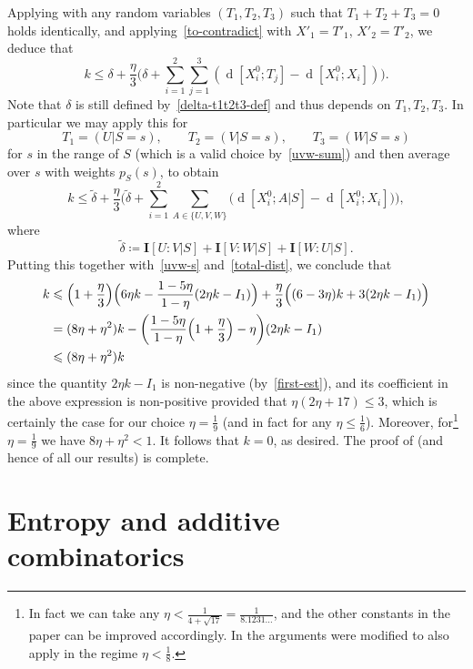 \documentclass[12pt,reqno,tbtags]{amsart}
\theoremstyle{definition}
\theoremstyle{remark}
\renewcommand{\leq}{\leqslant}
\renewcommand{\le}{\leq}
\newcommand{\I}[1]{\mathbf{I}[#1]}
\newcommand{\dist}[2]{{\operatorname{d}[#1;#2]}} %
\numberwithin{equation}{section}
\begin{document}
Applying  with any random variables $(T_1,T_2,T_3)$ such that $T_1+T_2+T_3=0$ holds identically, and applying~\eqref{to-contradict} with $X'_1 = T'_1$, $X'_2 = T'_2$, we deduce that
\[
  k \leq \delta + \frac{\eta}{3} \biggl( \delta + \sum_{i=1}^2 \sum_{j = 1}^3 (\dist{X^0_i}{T_j} -\dist{X^0_i}{X_i}) \biggr).
\]
Note that $\delta$ is still defined by~\eqref{delta-t1t2t3-def} and thus depends on $T_1,T_2,T_3$.
In particular we may apply this for
\[
  T_1 = (U | S = s),\qquad T_2 = (V | S = s), \qquad T_3 = (W | S = s)
\]
for $s$ in the range of $S$ (which is a valid choice by~\eqref{uvw-sum}) and then average over $s$ with weights $p_S(s)$, to obtain
\begin{equation}\label{almost-done}
  k \leq \tilde \delta + \frac{\eta}{3} \biggl( \tilde \delta + \sum_{i=1}^2 \sum_{A\in\{U,V,W\}} \bigl(  \dist{X^0_i}{A|S} - \dist{X^0_i}{X_i}\bigr) \biggr),
\end{equation}
where
\[
  \tilde \delta \coloneqq  \I{U : V | S} + \I{V : W | S} + \I{W : U | S}.
\]
Putting this together with~\eqref{uvw-s} and~\eqref{total-dist}, we conclude that
\begin{align*}
  k &\leq \Bigl(1+\frac{\eta}{3}\Bigr)\Bigl(6\eta k-\frac{1-5\eta}{1-\eta}(2\eta k-I_1)\Bigr)+\frac{\eta}{3}\Bigl((6-3\eta)k+3(2\eta k-I_1)\Bigr)\\
  &= (8\eta + \eta^2) k - \biggl( \frac{1 - 5 \eta}{1-\eta}\Bigl(1 + \frac{\eta}{3}\Bigr) -  \eta \biggr)(2 \eta k - I_1)\\
  &\leq (8 \eta + \eta^2) k
 \end{align*}
since the quantity $2 \eta k - I_1$ is non-negative (by~\eqref{first-est}), and its coefficient in the above expression is non-positive provided that $\eta(2\eta + 17) \le 3$, which is certainly the case for our choice $\eta = \frac{1}{9}$ (and in fact for any $\eta \leq \frac{1}{6}$).
Moreover, for\footnote{In fact we can take any $\eta<\frac{1}{4 + \sqrt{17}} = \frac{1}{8.1231\dots}$, and the other constants in the paper can be improved accordingly. In \cite{liao1,liao2} the arguments were modified to also apply in the regime $\eta < \frac{1}{8}$.} $\eta=\tfrac{1}{9}$ we have $8 \eta + \eta^2 < 1$. It follows that $k=0$, as desired.
The proof of  (and hence of all our results) is complete.

\appendix

\section{Entropy and additive combinatorics}\label{entropy-app}
\end{document}
